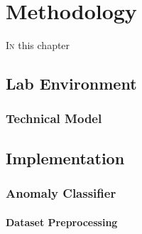 \chapter{Methodology}
\label{chap:methodology}

\lettrine[lines=3, findent=3pt, nindent=0pt]{I}{n} this chapter \textcolor{dimgray}{\lipsum[1]}


\section{Lab Environment}
\label{sec:environment}

\textcolor{dimgray}{\lipsum[1]}


\subsection{Technical Model}
\label{subsec:technical-model}

\textcolor{dimgray}{\lipsum[1]}


\section{Implementation}
\label{sec:implemntation}

\textcolor{dimgray}{\lipsum[1]}


\subsection{Anomaly Classifier}
\label{subsec:classifier-implementation}

\textcolor{dimgray}{\lipsum[1]}


\subsubsection{Dataset Preprocessing}
\label{subsubsec:ac-preprocessing}

